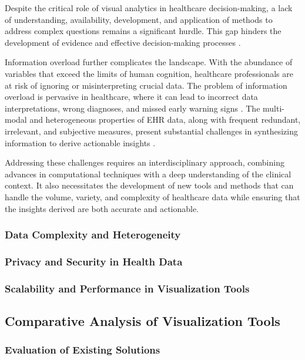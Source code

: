 Despite the critical role of visual analytics in healthcare decision-making, a lack of understanding, availability, development, and application of methods to address complex questions remains a significant hurdle. This gap hinders the development of evidence and effective decision-making processes \cite{soa17}\cite{soa18}.

Information overload further complicates the landscape. With the abundance of variables that exceed the limits of human cognition, healthcare professionals are at risk of ignoring or misinterpreting crucial data. The problem of information overload is pervasive in healthcare, where it can lead to incorrect data interpretations, wrong diagnoses, and missed early warning signs \cite{soa19}\cite{soa20}. The multi-modal and heterogeneous properties of EHR data, along with frequent redundant, irrelevant, and subjective measures, present substantial challenges in synthesizing information to derive actionable insights \cite{soa20}.

Addressing these challenges requires an interdisciplinary approach, combining advances in computational techniques with a deep understanding of the clinical context. It also necessitates the development of new tools and methods that can handle the volume, variety, and complexity of healthcare data while ensuring that the insights derived are both accurate and actionable.

\subsubsection{Data Complexity and Heterogeneity}\label{data-complexity-and-heterogeneity}
\subsubsection{Privacy and Security in Health Data}\label{privacy-and-security-in-health-data}
\subsubsection{Scalability and Performance in Visualization Tools}\label{scalability-and-performance-in-visualization-tools}

\subsection{Comparative Analysis of Visualization Tools}\label{comparative-analysis-of-visualization-tools}
\subsubsection{Evaluation of Existing Solutions}\label{evaluation-of-existing-solutions}
